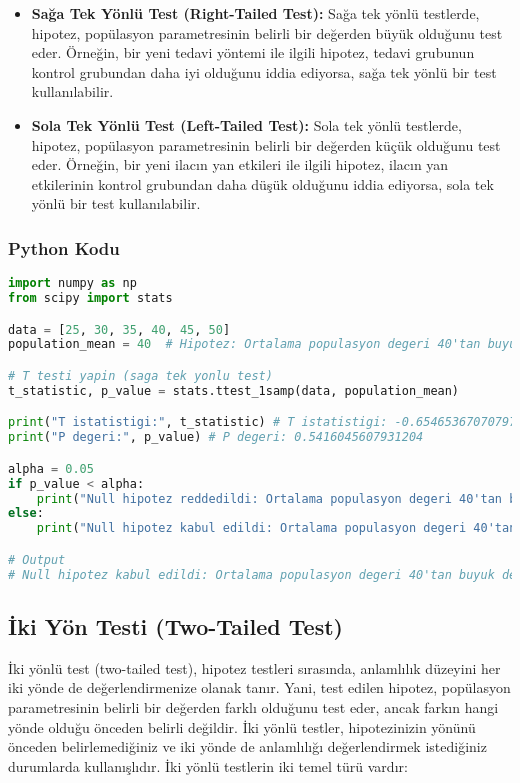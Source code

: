 \begin{itemize}
    \item \textbf{Sağa Tek Yönlü Test (Right-Tailed Test):} Sağa tek yönlü testlerde, hipotez, popülasyon parametresinin belirli bir değerden büyük olduğunu test eder. Örneğin, bir yeni tedavi yöntemi ile ilgili hipotez, tedavi grubunun kontrol grubundan daha iyi olduğunu iddia ediyorsa, sağa tek yönlü bir test kullanılabilir.
    \item \textbf{Sola Tek Yönlü Test (Left-Tailed Test):} Sola tek yönlü testlerde, hipotez, popülasyon parametresinin belirli bir değerden küçük olduğunu test eder. Örneğin, bir yeni ilacın yan etkileri ile ilgili hipotez, ilacın yan etkilerinin kontrol grubundan daha düşük olduğunu iddia ediyorsa, sola tek yönlü bir test kullanılabilir.
\end{itemize}

\subsubsection{Python Kodu}

\begin{lstlisting}[language=Python]
import numpy as np
from scipy import stats

data = [25, 30, 35, 40, 45, 50]
population_mean = 40  # Hipotez: Ortalama populasyon degeri 40'tan buyuktur.

# T testi yapin (saga tek yonlu test)
t_statistic, p_value = stats.ttest_1samp(data, population_mean)

print("T istatistigi:", t_statistic) # T istatistigi: -0.6546536707079772
print("P degeri:", p_value) # P degeri: 0.5416045607931204

alpha = 0.05
if p_value < alpha:
    print("Null hipotez reddedildi: Ortalama populasyon degeri 40'tan buyuktur.")
else:
    print("Null hipotez kabul edildi: Ortalama populasyon degeri 40'tan buyuk degildir.")

# Output
# Null hipotez kabul edildi: Ortalama populasyon degeri 40'tan buyuk degildir.
\end{lstlisting}

\newpage

\subsection{İki Yön Testi (Two-Tailed Test)}
İki yönlü test (two-tailed test), hipotez testleri sırasında, anlamlılık düzeyini her iki yönde de değerlendirmenize olanak tanır. Yani, test edilen hipotez, popülasyon parametresinin belirli bir değerden farklı olduğunu test eder, ancak farkın hangi yönde olduğu önceden belirli değildir. İki yönlü testler, hipotezinizin yönünü önceden belirlemediğiniz ve iki yönde de anlamlılığı değerlendirmek istediğiniz durumlarda kullanışlıdır. İki yönlü testlerin iki temel türü vardır:

